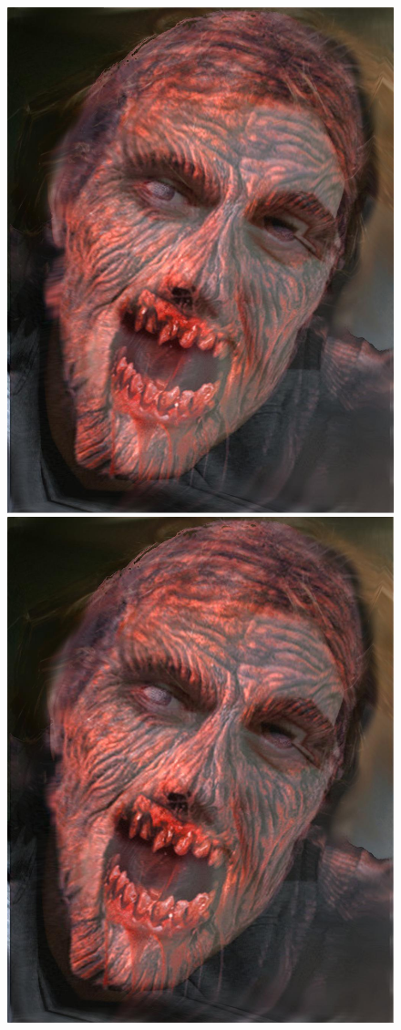 \documentclass[11pt]{article}
\begin{document}
\begin{figure}[H]
\begin{center}
\includegraphics[scale=0.08]{figs/zombie/zombie_bf_15.jpg} 
\includegraphics[scale=0.08]{figs/zombie/zombie_bf_16.jpg} 

\end{center}
\end{figure}
\end{document}
